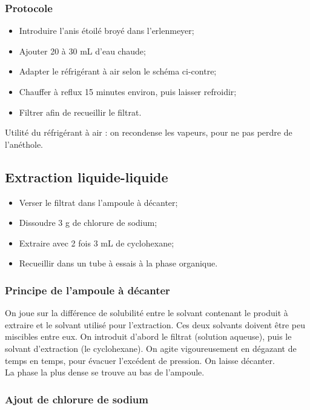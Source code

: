 \documentclass[11pt,a4paper]{report}
\begin{document}
\subsubsection*{Protocole}
\begin{itemize}
	\item Introduire l'anis étoilé broyé dans l'erlenmeyer;
	\item Ajouter 20 à 30 mL d'eau chaude;
	\item Adapter le réfrigérant à air selon le schéma ci-contre;
	\item Chauffer à reflux 15 minutes environ, puis laisser refroidir;
	\item Filtrer afin de recueillir le filtrat.
\end{itemize}

Utilité du réfrigérant à air : on recondense les vapeurs, pour ne pas perdre de l'anéthole.

\subsection{Extraction liquide-liquide}

\begin{itemize}
	\item Verser le filtrat dans l'ampoule à décanter;
	\item Dissoudre 3 g de chlorure de sodium;
	\item Extraire avec 2 fois 3 mL de cyclohexane;
	\item Recueillir dans un tube à essais à la phase organique.
\end{itemize}

\subsubsection*{Principe de l'ampoule à décanter}

On joue sur la différence de solubilité entre le solvant contenant le produit à extraire et le solvant utilisé pour l'extraction. Ces deux solvants doivent être peu miscibles entre eux. On introduit d'abord le filtrat (solution aqueuse), puis le solvant d'extraction (le cyclohexane). On agite vigoureusement en dégazant de temps en temps, pour évacuer l'excédent de pression. On laisse décanter.\\

La phase la plus dense se trouve au bas de l'ampoule. 

\subsubsection*{Ajout de chlorure de sodium}
\end{document}

